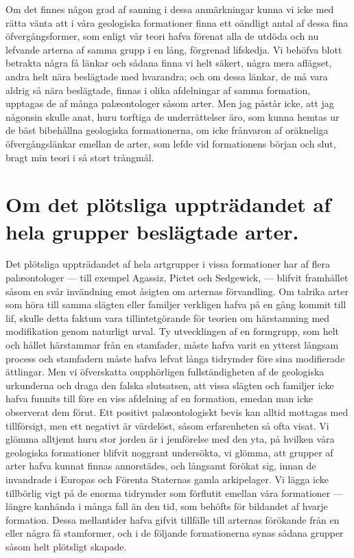 Om det finnes någon grad af sanning i dessa anmärkningar kunna vi icke med rätta vänta att i våra geologiska formationer finna ett oändligt antal af dessa fina öfvergångsformer, som enligt vår teori hafva förenat alla de utdöda och nu lefvande arterna af samma grupp i en lång, förgrenad lifskedja. Vi behöfva blott betrakta några få länkar och sådana finna vi helt säkert, några mera aflägset, andra helt nära beslägtade med hvarandra; och om dessa länkar, de må vara aldrig så nära beslägtade, finnas i olika afdelningar af samma formation, upptagas de af många palæontologer såsom arter. Men jag påstår icke, att jag någonsin skulle anat, huru torftiga de underrättelser äro, som kunna hemtas ur de bäst bibehållna geologiska formationerna, om icke frånvaron af oräkneliga öfvergångslänkar emellan de arter, som lefde vid formationens början och slut, bragt min teori i så stort trångmål.



\section[Beslägtade arter]{Om det plötsliga uppträdandet af hela grupper
beslägtade arter.}

Det plötsliga uppträdandet af hela artgrupper i vissa formationer har af flera palæontologer — till exempel Agassiz, Pictet och Sedgewick, — blifvit framhållet såsom en svår invändning emot åsigten om arternas förvandling. Om talrika arter som höra till samma slägten eller familjer verkligen hafva på en gång kommit till lif, skulle detta faktum vara tillintetgörande för teorien om härstamning med modifikation genom naturligt urval. Ty utvecklingen af en formgrupp, som helt och hållet härstammar från en stamfader, måste hafva varit en ytterst långsam process och stamfadern måste hafva lefvat långa tidrymder före sina modifierade ättlingar. Men vi öfverskatta oupphörligen fullständigheten af de geologiska urkunderna och draga den falska slutsatsen, att vissa slägten och familjer icke hafva funnits till före en viss afdelning af en formation, emedan man icke observerat dem förut. Ett positivt palæontologiskt bevis kan alltid mottagas med tillförsigt, men ett negativt är värdelöst, såsom erfarenheten så ofta visat. Vi glömma alltjemt huru stor jorden är i jemförelse med den yta, på hvilken våra geologiska formationer blifvit noggrant undersökta, vi glömma, att grupper af arter hafva kunnat finnas annorstädes, och långsamt förökat sig, innan de invandrade i Europas och Förenta Staternas gamla arkipelager. Vi lägga icke tillbörlig vigt på de enorma tidrymder som förflutit emellan våra formationer — längre kanhända i många fall än den tid, som behöfts för bildandet af hvarje formation. Dessa mellantider hafva gifvit tillfälle till arternas förökande från en eller några få stamformer, och i de följande formationerna synas sådana grupper såsom helt plötsligt skapade.

